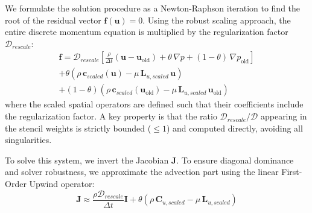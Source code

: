 \documentclass[preprint,12pt]{elsarticle}
\begin{document}
We formulate the solution procedure as a Newton-Raphson iteration to find the root of the residual vector $\mathbf{f}(\mathbf{u}) = 0$. Using the robust scaling approach, the entire discrete momentum equation is multiplied by the regularization factor $\mathcal{D}_{rescale}$:
\begin{multline}
    \mathbf{f} = \mathcal{D}_{rescale} \left[ \frac{\rho}{\Delta t} (\mathbf{u} - \mathbf{u}_\mathrm{old}) + \theta \, \nabla p + (1-\theta) \, \nabla p_\mathrm{old} \right] \\
    + \theta \left( \rho \, \mathbf{c}_{scaled}(\mathbf{u}) - \mu \, \mathbf{L}_{u,scaled} \, \mathbf{u} \right)
    \\+ (1-\theta) \left( \rho \, \mathbf{c}_{scaled}(\mathbf{u}_\mathrm{old}) - \mu \, \mathbf{L}_{u,scaled} \, \mathbf{u}_\mathrm{old} \right)
\end{multline}
where the scaled spatial operators are defined such that their coefficients include the regularization factor. A key property is that the ratio $\mathcal{D}_{rescale}/\mathcal{D}$ appearing in the stencil weights is strictly bounded ($\le 1$) and computed directly, avoiding all singularities.

To solve this system, we invert the Jacobian $\mathbf{J}$. To ensure diagonal dominance and solver robustness, we approximate the advection part using the linear First-Order Upwind operator:
\begin{equation}
    \mathbf{J} \approx \frac{\rho \mathcal{D}_{rescale}}{\Delta t} \mathbf{I} + \theta (\rho \, \mathbf{C}_{u,scaled} - \mu \, \mathbf{L}_{u,scaled})
\end{equation}
\end{document}
